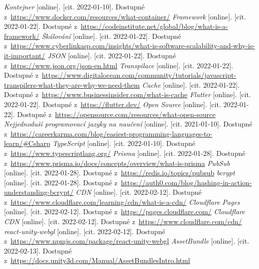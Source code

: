 \begin{thebibliography}{99}
     \textit{Kontejner} [online]. [cit. 2022-01-10]. Dostupné z~\url{https://www.docker.com/resources/what-container/}
     \textit{Framework} [online]. [cit. 2022-01-22]. Dostupné z~\url{https://codeinstitute.net/global/blog/what-is-a-framework/}
     \textit{Škálování} [online]. [cit. 2022-01-22]. Dostupné z~\url{https://www.cyberlinkasp.com/insights/what-is-software-scalability-and-why-is-it-important/}
     \textit{JSON} [online]. [cit. 2022-01-22]. Dostupné z~\url{https://www.json.org/json-en.html}
     \textit{Transpilace} [online]. [cit. 2022-01-22]. Dostupné z~\url{https://www.digitalocean.com/community/tutorials/javascript-transpilers-what-they-are-why-we-need-them}
     \textit{Cache} [online]. [cit. 2022-01-22]. Dostupné z~\url{https://www.businessinsider.com/what-is-cache}
     \textit{Flutter} [online]. [cit. 2022-01-22]. Dostupné z~\url{https://flutter.dev/}
     \textit{Open Source} [online]. [cit. 2022-01-22]. Dostupné z~\url{https://opensource.com/resources/what-open-source}
     \textit{Nejjednoduší programovací jazyky na naučení} [online]. [cit. 2021-01-10]. Dostupné z~\url{https://careerkarma.com/blog/easiest-programming-languages-to-learn/#Csharp}
     \textit{TypeScript} [online]. [cit. 2022-01-10]. Dostupné z~\url{https://www.typescriptlang.org/}
     \textit{Prisma} [online]. [cit. 2022-01-28]. Dostupné z~\url{https://www.prisma.io/docs/concepts/overview/what-is-prisma}
     \textit{PubSub} [online]. [cit. 2022-01-28]. Dostupné z~\url{https://redis.io/topics/pubsub}
     \textit{bcrypt} [online]. [cit. 2022-01-28]. Dostupné z~\url{https://auth0.com/blog/hashing-in-action-understanding-bcrypt/}
     \textit{CDN} [online]. [cit. 2022-02-12]. Dostupné z~\url{https://www.cloudflare.com/learning/cdn/what-is-a-cdn/}
     \textit{Cloudflare Pages} [online]. [cit. 2022-02-12]. Dostupné z~\url{https://pages.cloudflare.com/}
     \textit{Cloudflare CDN} [online]. [cit. 2022-02-12]. Dostupné z~\url{https://www.cloudflare.com/cdn/}
     \textit{react-unity-webgl} [online]. [cit. 2022-02-12]. Dostupné z~\url{https://www.npmjs.com/package/react-unity-webgl}
     \textit{AssetBundle} [online]. [cit. 2022-02-13]. Dostupné z~\url{https://docs.unity3d.com/Manual/AssetBundlesIntro.html}

\end{thebibliography}
